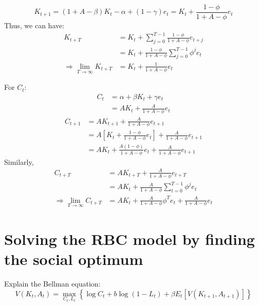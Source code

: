 \begin{solution}
    \begin{equation}
        K_{t+1} = (1+A-\beta) K_t - \alpha + (1-\gamma) e_t = K_t + \frac{1-\phi}{1+A-\phi}e_t
    \end{equation}
    Thus, we can have:
    \begin{align*}
        K_{t+T} &= K_t + \sum_{j=0}^{T-1} \frac{1-\phi}{1+A-\phi}e_{t+j} \\
        &= K_t + \frac{1-\phi}{1+A-\phi} \sum_{j=0}^{T-1} \phi^j e_{t} \\
        \Rightarrow \lim_{T \to \infty} K_{t+T} &= K_t + \frac{1}{1+A-\phi} e_t
    \end{align*}

    For $C_t$:
    \begin{align*}
        C_t &= \alpha  + \beta K_t + \gamma e_t \\
        &= A K_t + \frac{A}{1+A-\phi} e_t
    \end{align*}
    \begin{align*}
        C_{t+1} &= A K_{t+1} + \frac{A}{1+A-\phi} e_{t+1} \\
        &= A \left[K_t + \frac{1-\phi}{1+A-\phi}e_t\right] + \frac{A}{1+A-\phi} e_{t+1}  \\
        &= A K_t + \frac{A(1-\phi )}{1+A-\phi} e_t + \frac{A}{1+A-\phi} e_{t+1} 
    \end{align*}
    Similarly,
    \begin{align*}
        C_{t+T} &= A K_{t+T} + \frac{A}{1+A-\phi} e_{t+T} \\
        &= A K_t + \frac{A}{1+A-\phi} \sum_{t=0}^{T-1} \phi^j e_t \\
        \Rightarrow \lim_{T \to \infty} C_{t+T} &= A K_t + \frac{A}{1+A-\phi} \phi^T e_t + \frac{A}{1+A-\phi} e_t
    \end{align*}
\end{solution}



\section{Solving the RBC model by finding the social optimum}

\begin{problem}[1]
    Explain the Bellman equation:
    \begin{equation}
        V(K_t, A_t) = \max_{C_t, L_t} \left\{\log{C_t} + b\log{(1-L_t)} + \beta E_t \left[V(K_{t+1}, A_{t+1})\right] \right\}
    \end{equation}
\end{problem}

